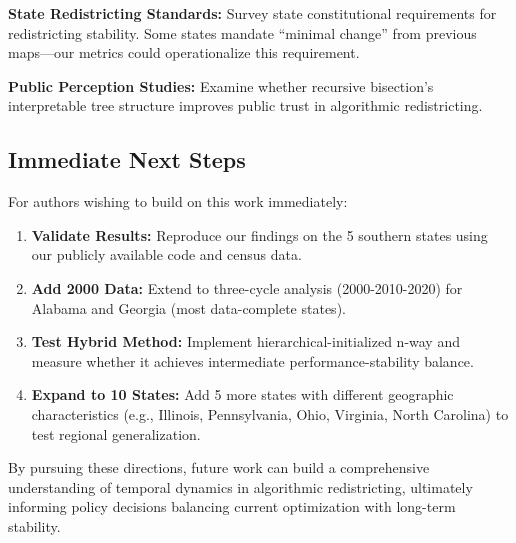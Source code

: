 \textbf{State Redistricting Standards:} Survey state constitutional requirements for redistricting stability. Some states mandate ``minimal change'' from previous maps—our metrics could operationalize this requirement.

\textbf{Public Perception Studies:} Examine whether recursive bisection's interpretable tree structure improves public trust in algorithmic redistricting.

\subsection{Immediate Next Steps}

For authors wishing to build on this work immediately:

\begin{enumerate}
    \item \textbf{Validate Results:} Reproduce our findings on the 5 southern states using our publicly available code and census data.

    \item \textbf{Add 2000 Data:} Extend to three-cycle analysis (2000-2010-2020) for Alabama and Georgia (most data-complete states).

    \item \textbf{Test Hybrid Method:} Implement hierarchical-initialized n-way and measure whether it achieves intermediate performance-stability balance.

    \item \textbf{Expand to 10 States:} Add 5 more states with different geographic characteristics (e.g., Illinois, Pennsylvania, Ohio, Virginia, North Carolina) to test regional generalization.
\end{enumerate}

By pursuing these directions, future work can build a comprehensive understanding of temporal dynamics in algorithmic redistricting, ultimately informing policy decisions balancing current optimization with long-term stability.
